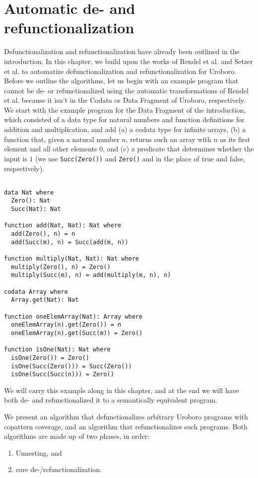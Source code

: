 \chapter{Automatic de- and refunctionalization}

Defunctionalization and refunctionalization have already been outlined in the introduction. In this chapter, we build upon the works of Rendel et al.\cite{rendel15automatic} and Setzer et al.\cite{setzer14unnesting} to automatize defunctionalization and refunctionalization for Uroboro. Before we outline the algorithms, let us begin with an example program that cannot be de- or refunctionalized using the automatic transformations of Rendel et al. because it isn't in the Codata or Data Fragment of Uroboro, respectively. We start with the example program for the Data Fragment of the introduction, which consisted of a data type for natural numbers and function definitions for addition and multiplication, and add (a) a codata type for infinite arrays, (b) a function that, given a natural number $n$, returns such an array with $n$ as its first element and all other elements $0$, and (c) a predicate that determines whether the input is $1$ (we use \texttt{Succ(Zero())} and \texttt{Zero()} and in the place of true and false, respectively).

\begin{lstlisting}

data Nat where
  Zero(): Nat
  Succ(Nat): Nat

function add(Nat, Nat): Nat where
  add(Zero(), n) = n
  add(Succ(m), n) = Succ(add(m, n))

function multiply(Nat, Nat): Nat where
  multiply(Zero(), n) = Zero()
  multiply(Succ(m), n) = add(multiply(m, n), n)

codata Array where
  Array.get(Nat): Nat

function oneElemArray(Nat): Array where
  oneElemArray(n).get(Zero()) = n
  oneElemArray(n).get(Succ(m)) = Zero()

function isOne(Nat): Nat where
  isOne(Zero()) = Zero()
  isOne(Succ(Zero())) = Succ(Zero())
  isOne(Succ(Succ(n))) = Zero()

\end{lstlisting}

We will carry this example along in this chapter, and at the end we will have both de- and refunctionalized it to a semantically equivalent program.

We present an algorithm that defunctionalizes arbitrary Uroboro programs with copattern coverage, and an algorithm that refunctionalizes such programs. Both algorithms are made up of two phases, in order:
\begin{enumerate}
\item Unnesting, and
\item core de-/refunctionalization.
\end{enumerate}

